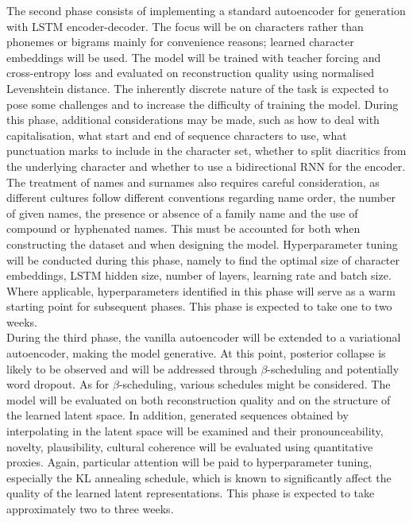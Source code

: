 \documentclass[Main.tex]{subfiles}
\begin{document}
The second phase consists of implementing a standard autoencoder for generation with LSTM encoder-decoder. The focus will be on characters rather than phonemes or bigrams mainly for convenience reasons; learned character embeddings will be used. The model will be trained with teacher forcing and cross-entropy loss and evaluated on reconstruction quality using normalised Levenshtein distance. The inherently discrete nature of the task is expected to pose some challenges and to increase the difficulty of training the model. During this phase, additional considerations may be made, such as how to deal with capitalisation, what start and end of sequence characters to use, what punctuation marks to include in the character set, whether to split diacritics from the underlying character and whether to use a bidirectional RNN for the encoder. The treatment of names and surnames also requires careful consideration, as different cultures follow different conventions regarding name order, the number of given names, the presence or absence of a family name and the use of compound or hyphenated names. This must be accounted for both when constructing the dataset and when designing the model. Hyperparameter tuning will be conducted during this phase, namely to find the optimal size of character embeddings, LSTM hidden size, number of layers, learning rate and batch size. Where applicable, hyperparameters identified in this phase will serve as a warm starting point for subsequent phases. This phase is expected to take one to two weeks.\\

During the third phase, the vanilla autoencoder will be extended to a variational autoencoder, making the model generative. At this point, posterior collapse is likely to be observed and will be addressed through $\beta$-scheduling and potentially word dropout. As for $\beta$-scheduling, various schedules might be considered. The model will be evaluated on both reconstruction quality and on the structure of the learned latent space. In addition, generated sequences obtained by interpolating in the latent space will be examined and their pronounceability, novelty, plausibility, cultural coherence  will be evaluated using quantitative proxies. Again, particular attention will be paid to hyperparameter tuning, especially the KL annealing schedule, which is known to significantly affect the quality of the learned latent representations. This phase is expected to take approximately two to three weeks.\\
\end{document}
